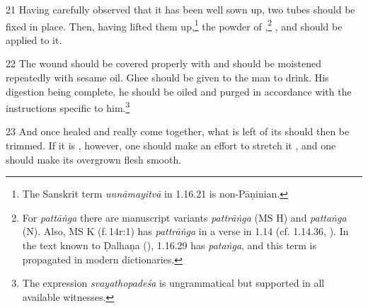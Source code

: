\begin{translation}
    \item[21] 
    Having carefully observed that it has been well sown up,
    two tubes should be fixed in place.  Then, having lifted them up,\footnote{The 
    Sanskrit term \emph{unnāmayitvā} in 1.16.21 is non-Pāṇinian.}
    the powder of
    ,\footnote{For \emph{pattāṅga} there are manuscript variants 
    \emph{pattrāṅga} (MS H) and \emph{pattaṅga}    (N).  Also, MS K (f.\,14r:1) has \emph{pattrāṅga} in a verse in 1.14 (cf. 1.14.36, \cite[66]{vulgate}). In the text known to Ḍalhaṇa (\cite[81]{vulgate}), 1.16.29 has \emph{pataṅga}, and this term is propagated in modern dictionaries.}
    ,
    and
    should be applied to it.
    
    \item[22] 
    The wound should be covered properly with  and should be
    moistened repeatedly with sesame oil.  Ghee should be given to the man to
    drink.  His digestion being complete, he should be oiled and purged in
    accordance with the instructions specific to him.\footnote{The expression 
    \emph{svayathopadeśa} is ungrammatical but supported in all available 
    witnesses.}   
    
    \item[23] %
    And once healed and really come together, what is left of its 
    should then be trimmed. If it is  , however, one should make an
    effort to stretch it , and one should make its overgrown flesh smooth.
    
    
\end{translation}    
